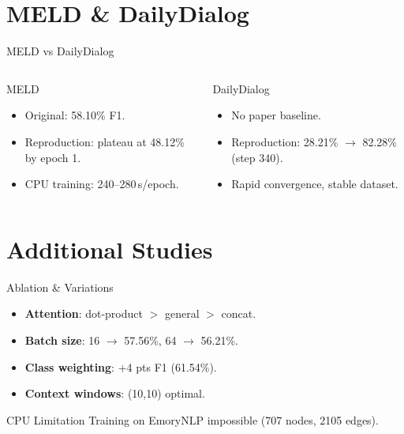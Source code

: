 \documentclass[10pt,aspectratio=169]{beamer}
\begin{document}
\section{MELD \& DailyDialog}
\begin{frame}{MELD vs DailyDialog}
  \begin{columns}
    \begin{block}{MELD}
      \begin{itemize}
        \item Original: 58.10\% F1.
        \item Reproduction: plateau at 48.12\% by epoch 1.
        \item CPU training: 240--280\,s/epoch.
      \end{itemize}
    \end{block}
    \begin{block}{DailyDialog}
      \begin{itemize}
        \item No paper baseline.
        \item Reproduction: 28.21\% $\to$ 82.28\% (step 340).
        \item Rapid convergence, stable dataset.
      \end{itemize}
    \end{block}
  \end{columns}
\end{frame}

\section{Additional Studies}
\begin{frame}{Ablation \& Variations}
  \begin{itemize}
    \item \textbf{Attention}: dot-product $>$ general $>$ concat.
    \item \textbf{Batch size}: 16 $\to$ 57.56\%, 64 $\to$ 56.21\%.
    \item \textbf{Class weighting}: +4 pts F1 (61.54\%).
    \item \textbf{Context windows}: (10,10) optimal.
  \end{itemize}
  \vfill
  \begin{block}{CPU Limitation}
    Training on EmoryNLP impossible (707 nodes, 2105 edges).
  \end{block}
\end{frame}
\end{document}
